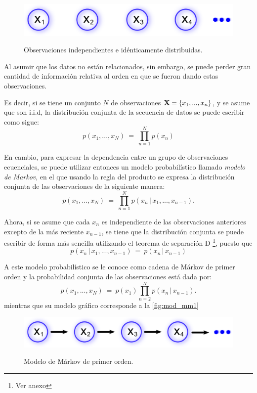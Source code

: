 \begin{figure}[bt]
        \myfloatalign
        {\includegraphics[width=0.6\linewidth]{gfx/chap2/mod-iid}}        
        \caption{Observaciones independientes e idénticamente distribuidas.}
        \label{fig:mod_iid}
\end{figure}

Al asumir que los datos no están relacionados, sin embargo, se puede perder gran cantidad de información relativa al orden en que se fueron dando estas observaciones.

Es decir, si se tiene un conjunto $N$ de observaciones $\textbf{X} = \lbrace x_1, ..., x_n \rbrace$, y se asume que son i.i.d, la distribución conjunta de la secuencia de datos se puede escribir como sigue:
\begin{equation}
\label{eqn:2-1}
p(x_1, ..., x_N) ~=~ \prod_{n=1}^N p(x_n)
\end{equation}

En cambio, para expresar la dependencia entre un grupo de observaciones ecuenciales, se puede utilizar entonces un modelo probabilístico llamado \textit{modelo de Markov}, en el que usando la regla del producto  se expresa la distribución conjunta de las observaciones de la siguiente manera:
\begin{equation}
\label{eqn:2-2}
p(x_1, ..., x_N) ~=~ \prod_{n=1}^N p(x_n \,|\, x_1, ..., x_{n-1}).
\end{equation}

Ahora, si se asume que cada $x_n$ es independiente de las observaciones anteriores excepto de la más reciente $x_{n-1}$, se tiene que la distribución conjunta se puede escribir de forma más sencilla utilizando el teorema de separación D \footnote{Ver anexo}, puesto que 
\begin{equation}
\label{eqn:2-3}
p(x_n \,|\, x_1, ..., x_{n-1}) ~=~ p(x_n \,|\, x_{n-1})
\end{equation}

A este modelo probabilístico se le conoce como cadena de Márkov de primer orden y la probabilidad conjunta de las observaciones está dada por:
\begin{equation}
\label{eqn:2-4}
p(x_1, ..., x_N) ~=~ p(x_1) \prod_{n=2}^N p(x_n \,|\, x_{n-1}).
\end{equation}
mientras que su modelo gráfico corresponde a la \autoref{fig:mod_mm1}
\begin{figure}[bt]
        \myfloatalign
        {\includegraphics[width=0.6\linewidth]{gfx/chap2/mod-mm1}}
        \caption{Modelo de Márkov de primer orden.}
        \label{fig:mod_mm1}
\end{figure}

